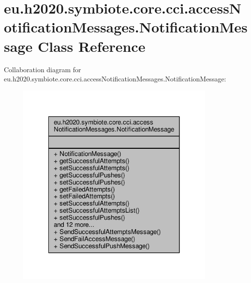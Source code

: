 \hypertarget{classeu_1_1h2020_1_1symbiote_1_1core_1_1cci_1_1accessNotificationMessages_1_1NotificationMessage}{}\section{eu.\+h2020.\+symbiote.\+core.\+cci.\+access\+Notification\+Messages.\+Notification\+Message Class Reference}
\label{classeu_1_1h2020_1_1symbiote_1_1core_1_1cci_1_1accessNotificationMessages_1_1NotificationMessage}


Collaboration diagram for eu.\+h2020.\+symbiote.\+core.\+cci.\+access\+Notification\+Messages.\+Notification\+Message\+:\nopagebreak
\begin{figure}[H]
\begin{center}
\leavevmode
\includegraphics[width=282pt]{classeu_1_1h2020_1_1symbiote_1_1core_1_1cci_1_1accessNotificationMessages_1_1NotificationMessage__coll__graph}
\end{center}
\end{figure}
